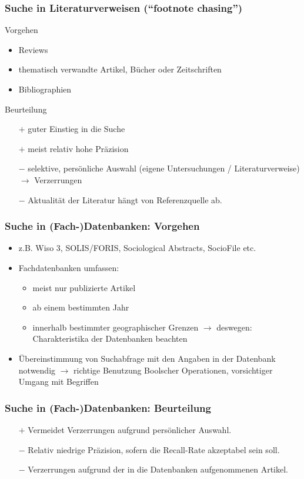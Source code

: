 \begin{frame}
  \frametitle{Suche in Literaturverweisen  ("`footnote chasing"')}
  \begin{block}{Vorgehen}
    \begin{itemize}[<+->]
    \item Reviews
    \item thematisch verwandte Artikel, Bücher oder Zeitschriften
    \item Bibliographien
    \end{itemize}
  \end{block}
  \pause
  \begin{block}{Beurteilung}
    \begin{itemize}[<+->]
    \item[$+$] guter Einstieg in die Suche
    \item[$+$] meist relativ hohe Präzision
    \item[$-$] selektive, persönliche Auswahl (eigene Untersuchungen / Literaturverweise) $\rightarrow$ Verzerrungen
    \item[$-$] Aktualität der Literatur hängt von Referenzquelle ab. 
    \end{itemize}
  \end{block}
\end{frame}


\begin{frame}
  \frametitle{Suche in (Fach-)Datenbanken: Vorgehen}
  \begin{itemize}[<+->]
  \item z.B. Wiso 3, SOLIS/FORIS, Sociological Abstracts, SocioFile etc.
  \item  Fachdatenbanken umfassen:
    \begin{itemize}
    \item  meist nur publizierte Artikel
    \item ab einem bestimmten Jahr
    \item innerhalb bestimmter geographischer Grenzen $\rightarrow$ deswegen: Charakteristika der Datenbanken beachten
    \end{itemize}
  \item Übereinstimmung von Suchabfrage mit den Angaben in der Datenbank notwendig $\rightarrow$ richtige Benutzung
    Boolscher Operationen, vorsichtiger Umgang mit Begriffen
  \end{itemize}
\end{frame}


\begin{frame}
  \frametitle{Suche in (Fach-)Datenbanken: Beurteilung}
  \begin{itemize}[<+->]
  \item[$+$] Vermeidet Verzerrungen aufgrund persönlicher Auswahl.
  \item[$-$] Relativ niedrige Präzision, sofern die Recall-Rate akzeptabel sein soll.
  \item[$-$] Verzerrungen aufgrund der in die Datenbanken aufgenommenen Artikel.
  \end{itemize}
\end{frame}

